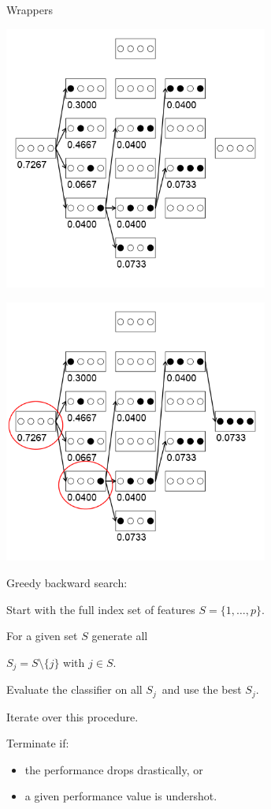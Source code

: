 \documentclass[11pt,compress,t,notes=noshow, xcolor=table]{beamer}
\begin{document}
\begin{vbframe}{Wrappers}
    \framebreak

    \begin{center}
    \includegraphics[width = 0.65\textwidth]{figure_man/wrapperanim5.png}
    \end{center}

    \framebreak

    \begin{center}
    \includegraphics[width = 0.65\textwidth]{figure_man/wrapperanim6.png}
    \end{center}

    \framebreak

    \begin{blocki}{Greedy backward search:}
      \item Start with the full index set of features $S = \{1, \ldots, p\}$.
      \item For a given set $S$ generate all

      $S_j = S \setminus\{j\}$ with $j \in S$.
      \item Evaluate the classifier on all $S_j$\
        and use the best $S_j$.
      \item Iterate over this procedure.
      \item Terminate if:
        \begin{itemize}
          \item the performance drops drastically, or
          \item a given performance value is undershot.
        \end{itemize}
      \end{blocki}


\end{vbframe}
\end{document}

